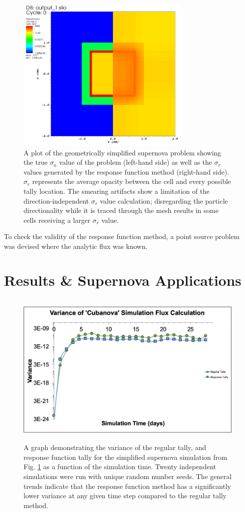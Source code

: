 \documentclass[]{article}
\begin{document}
	\begin{figure} [h!]
		\centering
		\includegraphics[height=3in]{Figures/cubanova_op_a.png}
		\caption{A plot of the geometrically simplified supernova problem showing the true $\sigma_{a}$ value of the problem (left-hand side) as well as the $\sigma_{r}$ values generated by the response function method (right-hand side). $\sigma_{r}$  represents the average opacity between the cell and every possible tally location. The smearing artifacts show a limitation of the direction-independent $\sigma_{r}$ value calculation; disregarding the  particle directionality while it is traced through the mesh results in some cells receiving a larger $\sigma_{r}$ value.}
		\label{fig:cubanova_op_a}
	\end{figure}

	To check the validity of the response function method, a point source problem was devised where the analytic flux was known.

\section{Results \& Supernova Applications}
	\begin{figure} [h!]
		\centering
		\includegraphics[height=3in]{Figures/cubanova_flux_var.png}
		\caption{A graph demonstrating the variance of the regular tally, and response function tally for the simplified supernova simulation from Fig. \ref{fig:cubanova_op_a} as a function of the simulation time. Twenty independent simulations were run with unique random number seeds. The general trends indicate that the response function method has a significantly lower variance at any given time step compared to the regular tally method.}
		\label{fig:cubanova_flux_var}
	\end{figure}
	
\end{document}
